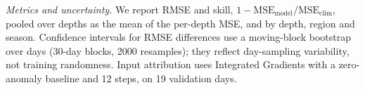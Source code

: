 \emph{Metrics and uncertainty.} We report RMSE and skill, $1-\mathrm{MSE}_{\mathrm{model}}/\mathrm{MSE}_{\mathrm{clim}}$, pooled over depths as the mean of the per-depth MSE, and by depth, region and season. Confidence intervals for RMSE differences use a moving-block bootstrap over days (30-day blocks, 2000 resamples); they reflect day-sampling variability, not training randomness. Input attribution uses Integrated Gradients \cite{ig} with a zero-anomaly baseline and 12 steps, on 19 validation days.
